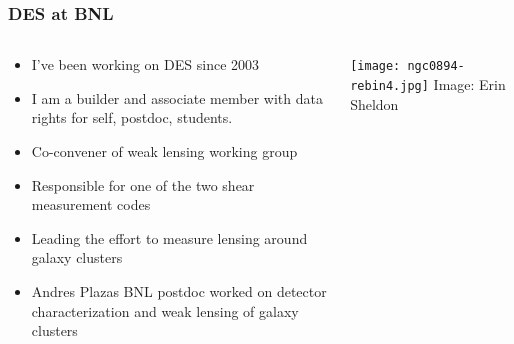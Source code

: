 \documentclass{beamer}
\begin{document}
\frame
{

    \frametitle{DES at BNL}

 
    \begin{columns}
        \begin{column}{0.5\textwidth}    
            \begin{itemize}

                \item I've been working on DES since 2003

                \item I am a {\color{gold} builder} and {\color{gold} associate
                    member} with data rights for self, postdoc, students.

                \item Co-convener of weak lensing working group

                \item Responsible for one of the two shear measurement codes

                \item Leading the effort to measure lensing around galaxy clusters

                \item Andres Plazas BNL postdoc worked on detector
                    characterization and weak lensing of galaxy clusters

            \end{itemize}
        \end{column}
        \begin{column}{0.5\textwidth}
                \centering
                \texttt{[image: ngc0894-rebin4.jpg]}
                \newline
                {\tiny Image: Erin Sheldon}
        \end{column}
    \end{columns}

}
\end{document}
